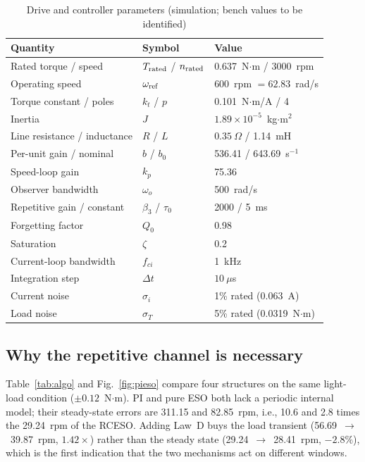 \documentclass[journal]{IEEEtran}
\theoremstyle{remark}
\begin{document}
\begin{table}[!t]
\centering
\caption{Drive and controller parameters (simulation; bench values to be identified)}
\label{tab:param}
\footnotesize
\setlength{\tabcolsep}{3pt}
\begin{tabular}{@{}lll@{}}
\toprule
Quantity & Symbol & Value\\
\midrule
Rated torque / speed & $T_{\rm rated}$ / $n_{\rm rated}$ & 0.637~N$\cdot$m / 3000~rpm\\
Operating speed & $\omega_{\rm ref}$ & 600~rpm $=62.83$~rad/s\\
Torque constant / poles & $k_t$ / $p$ & 0.101~N$\cdot$m/A / 4\\
Inertia & $J$ & $1.89\times10^{-5}$~kg$\cdot$m$^2$\\
Line resistance / inductance & $R$ / $L$ & $0.35~\Omega$ / 1.14~mH\\
Per-unit gain / nominal & $b$ / $b_0$ & 536.41 / 643.69~s$^{-1}$\\
Speed-loop gain & $k_p$ & 75.36\\
Observer bandwidth & $\omega_o$ & 500~rad/s\\
Repetitive gain / constant & $\beta_3$ / $\tau_0$ & 2000 / 5~ms\\
Forgetting factor & $Q_0$ & 0.98\\
Saturation & $\zeta$ & 0.2\\
Current-loop bandwidth & $f_{ci}$ & 1~kHz\\
Integration step & $\Delta t$ & $10~\mu$s\\
Current noise & $\sigma_i$ & 1\% rated (0.063~A)\\
Load noise & $\sigma_T$ & 5\% rated (0.0319~N$\cdot$m)\\
\bottomrule
\end{tabular}
\end{table}

\subsection{Why the repetitive channel is necessary}
Table~\ref{tab:algo} and Fig.~\ref{fig:pieso} compare four structures on the same
light-load condition ($\pm0.12$~N$\cdot$m). PI and pure ESO both lack a periodic
internal model; their steady-state errors are 311.15 and 82.85~rpm, i.e., 10.6 and 2.8
times the 29.24~rpm of the RCESO. Adding Law~D buys the load transient
(56.69~$\to$~39.87~rpm, $1.42\times$) rather than the steady state
(29.24~$\to$~28.41~rpm, $-2.8\%$), which is the first indication that the two
mechanisms act on different windows.
\end{document}
